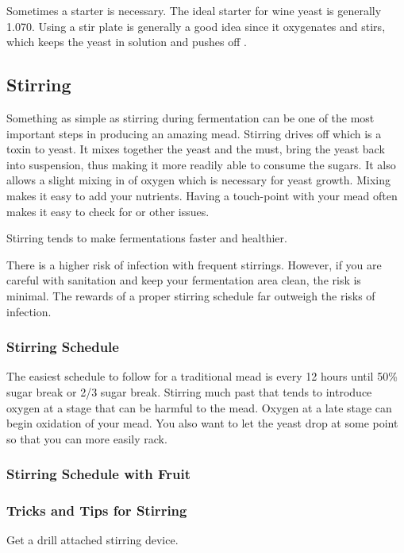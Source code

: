   Sometimes a starter is necessary. The ideal starter for wine yeast is generally 1.070. Using a stir plate is 
  generally a good idea since it oxygenates and stirs, which keeps the yeast in solution and pushes off .

 \subsection{Stirring}
  Something as simple as stirring during fermentation can be one of the most important steps in producing an 
  amazing mead. Stirring drives off  which is a toxin to yeast. It mixes together the yeast and the must, 
  bring the yeast back into suspension, thus making it more readily able to consume the sugars. It also
  allows a slight mixing in of oxygen which is necessary for yeast growth. Mixing makes it easy to add your 
  nutrients. Having a touch-point with your mead often makes it easy to check for  or other issues.

  Stirring tends to make fermentations faster and healthier. 

  There is a higher risk of infection with frequent stirrings. However, if you are careful with sanitation and 
  keep your fermentation area clean, the risk is minimal. The rewards of a proper stirring schedule far outweigh 
  the risks of infection.

  \subsubsection{Stirring Schedule}
   The easiest schedule to follow for a traditional mead is every 12 hours until 50\% sugar break or 2/3 sugar 
   break. Stirring much past that tends to introduce oxygen at a stage that can be harmful to the mead. 
   Oxygen at a late stage can begin oxidation of your mead.
   You also want to let the yeast drop at some point so that you can more easily rack.

  \subsubsection{Stirring Schedule with Fruit}

  \subsubsection{Tricks and Tips for Stirring}
   Get a drill attached stirring device.

